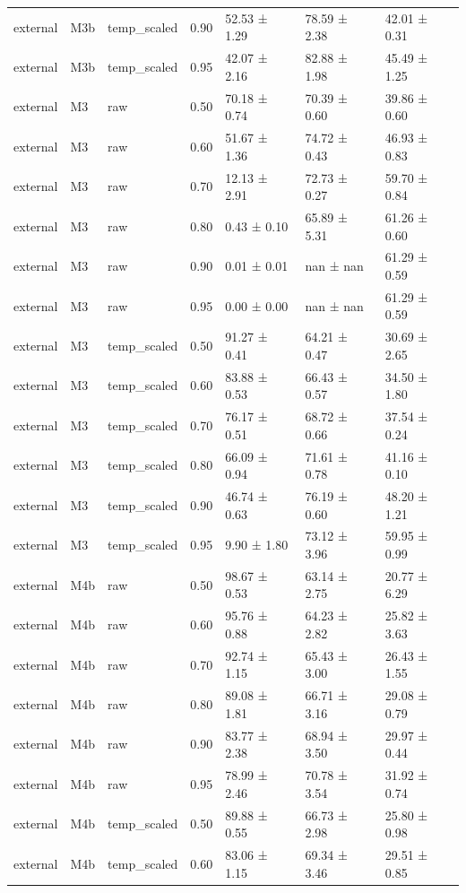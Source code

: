 \begin{tabular}{lllrlll}
external & M3b & temp\_scaled & 0.90 & 52.53 ± 1.29 & 78.59 ± 2.38 & 42.01 ± 0.31 \\
external & M3b & temp\_scaled & 0.95 & 42.07 ± 2.16 & 82.88 ± 1.98 & 45.49 ± 1.25 \\
external & M3 & raw & 0.50 & 70.18 ± 0.74 & 70.39 ± 0.60 & 39.86 ± 0.60 \\
external & M3 & raw & 0.60 & 51.67 ± 1.36 & 74.72 ± 0.43 & 46.93 ± 0.83 \\
external & M3 & raw & 0.70 & 12.13 ± 2.91 & 72.73 ± 0.27 & 59.70 ± 0.84 \\
external & M3 & raw & 0.80 & 0.43 ± 0.10 & 65.89 ± 5.31 & 61.26 ± 0.60 \\
external & M3 & raw & 0.90 & 0.01 ± 0.01 & nan ± nan & 61.29 ± 0.59 \\
external & M3 & raw & 0.95 & 0.00 ± 0.00 & nan ± nan & 61.29 ± 0.59 \\
external & M3 & temp\_scaled & 0.50 & 91.27 ± 0.41 & 64.21 ± 0.47 & 30.69 ± 2.65 \\
external & M3 & temp\_scaled & 0.60 & 83.88 ± 0.53 & 66.43 ± 0.57 & 34.50 ± 1.80 \\
external & M3 & temp\_scaled & 0.70 & 76.17 ± 0.51 & 68.72 ± 0.66 & 37.54 ± 0.24 \\
external & M3 & temp\_scaled & 0.80 & 66.09 ± 0.94 & 71.61 ± 0.78 & 41.16 ± 0.10 \\
external & M3 & temp\_scaled & 0.90 & 46.74 ± 0.63 & 76.19 ± 0.60 & 48.20 ± 1.21 \\
external & M3 & temp\_scaled & 0.95 & 9.90 ± 1.80 & 73.12 ± 3.96 & 59.95 ± 0.99 \\
external & M4b & raw & 0.50 & 98.67 ± 0.53 & 63.14 ± 2.75 & 20.77 ± 6.29 \\
external & M4b & raw & 0.60 & 95.76 ± 0.88 & 64.23 ± 2.82 & 25.82 ± 3.63 \\
external & M4b & raw & 0.70 & 92.74 ± 1.15 & 65.43 ± 3.00 & 26.43 ± 1.55 \\
external & M4b & raw & 0.80 & 89.08 ± 1.81 & 66.71 ± 3.16 & 29.08 ± 0.79 \\
external & M4b & raw & 0.90 & 83.77 ± 2.38 & 68.94 ± 3.50 & 29.97 ± 0.44 \\
external & M4b & raw & 0.95 & 78.99 ± 2.46 & 70.78 ± 3.54 & 31.92 ± 0.74 \\
external & M4b & temp\_scaled & 0.50 & 89.88 ± 0.55 & 66.73 ± 2.98 & 25.80 ± 0.98 \\
external & M4b & temp\_scaled & 0.60 & 83.06 ± 1.15 & 69.34 ± 3.46 & 29.51 ± 0.85 \\

\end{tabular}
